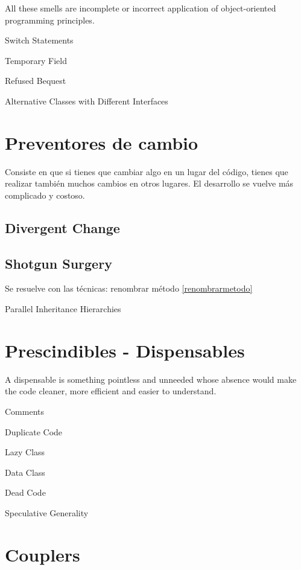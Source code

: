 \documentclass[11pt,a4paper,oneside]{book}
\begin{document}
All these smells are incomplete or incorrect application of object-oriented programming principles.

    Switch Statements
    
    Temporary Field

    Refused Bequest
    
    Alternative Classes with Different Interfaces





\section{Preventores de cambio}

Consiste en que si tienes que cambiar algo en un lugar del código, tienes que realizar también muchos cambios en otros lugares. El desarrollo se vuelve más complicado y costoso.

\subsection{Divergent Change}

    
\subsection{    Shotgun Surgery}

Se resuelve con las técnicas: renombrar método \ref{renombrarmetodo}

    Parallel Inheritance Hierarchies




\section{Prescindibles - Dispensables}

A dispensable is something pointless and unneeded whose absence would make the code cleaner, more efficient and easier to understand.

    Comments
    
    Duplicate Code
    
    Lazy Class

    Data Class

Dead Code

    Speculative Generality



\section{Couplers}
\end{document}
